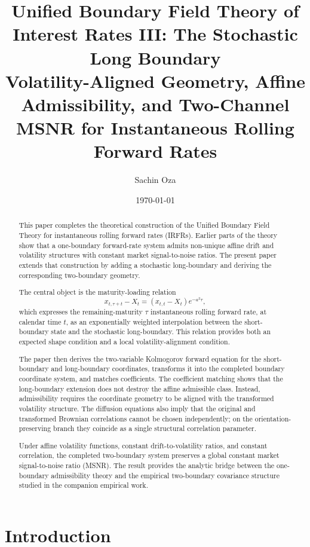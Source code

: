 \documentclass[11pt]{article}
\title{Unified Boundary Field Theory of Interest Rates III: The Stochastic Long Boundary \\\large Volatility-Aligned Geometry, Affine Admissibility, and Two-Channel MSNR for Instantaneous Rolling Forward Rates}
\author{Sachin Oza}
\date{\today}
\numberwithin{equation}{section}
\begin{document}
\maketitle

\begin{abstract}
This paper completes the theoretical construction of the Unified Boundary Field Theory for instantaneous rolling forward rates (IRFRs). Earlier parts of the theory show that a one-boundary forward-rate system admits non-unique affine drift and volatility structures with constant market signal-to-noise ratios. The present paper extends that construction by adding a stochastic long-boundary and deriving the corresponding two-boundary geometry.

The central object is the maturity-loading relation
\[
x_{t,\tau+t}-X_t
=
\left(x_{t,t}-X_t\right)e^{-a^2\tau},
\]
which expresses the remaining-maturity \(\tau\) instantaneous rolling forward rate, at calendar time \(t\), as an exponentially weighted interpolation between the short-boundary state and the stochastic long-boundary. This relation provides both an expected shape condition and a local volatility-alignment condition.

The paper then derives the two-variable Kolmogorov forward equation for the short-boundary and long-boundary coordinates, transforms it into the completed boundary coordinate system, and matches coefficients. The coefficient matching shows that the long-boundary extension does not destroy the affine admissible class. Instead, admissibility requires the coordinate geometry to be aligned with the transformed volatility structure. The diffusion equations also imply that the original and transformed Brownian correlations cannot be chosen independently; on the orientation-preserving branch they coincide as a single structural correlation parameter.

Under affine volatility functions, constant drift-to-volatility ratios, and constant correlation, the completed two-boundary system preserves a global constant market signal-to-noise ratio (MSNR). The result provides the analytic bridge between the one-boundary admissibility theory and the empirical two-boundary covariance structure studied in the companion empirical work.
\end{abstract}

\section{Introduction}
\end{document}
